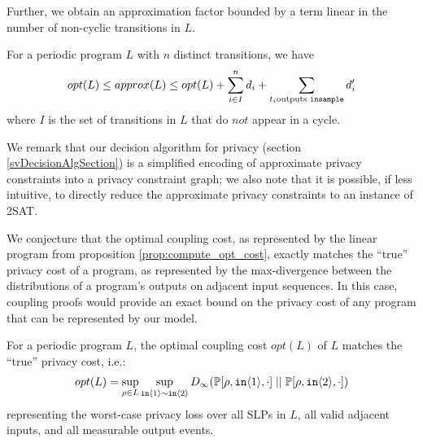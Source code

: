 Further, we obtain an approximation factor bounded by a term linear in the number of non-cyclic transitions in $L$. 

\begin{prop}
    \label{prop:approx_opt_are_close}
    For a periodic program $L$ with $n$ distinct transitions, we have 
    \[opt(L) \leq approx(L) \leq opt(L) + \sum_{i \in I }^n d_i + \sum_{t_i \text{outputs \texttt{insample}}} d_i'\]
    where $I$ is the set of transitions in $L$ that do $\textit{not}$ appear in a cycle.
\end{prop}

We remark that our decision algorithm for privacy (section \ref{svDecisionAlgSection}) is a simplified encoding of approximate privacy constraints into a privacy constraint graph; we also note that it is possible, if less intuitive, to directly reduce the approximate privacy constraints to an instance of 2SAT. 

We conjecture that the optimal coupling cost, as represented by the linear program from proposition \ref{prop:compute_opt_cost}, exactly matches the ``true'' privacy cost of a program, as represented by the max-divergence between the distributions of a program's outputs on adjacent input sequences. In this case, coupling proofs would provide an exact bound on the privacy cost of any program that can be represented by our model. 

\begin{conj}
    For a periodic program $L$, the optimal coupling cost $opt(L)$ of $L$ matches the ``true'' privacy cost, i.e.:
    \begin{align*}
        opt(L) = \sup_{\rho \in L} \sup_{\texttt{in}\langle1 \rangle \sim \texttt{in}\langle2 \rangle} D_\infty(\mathbb{P}[\rho, \texttt{in}\langle1 \rangle, \cdot]\; ||\; \mathbb{P}[\rho, \texttt{in}\langle2 \rangle, \cdot])
    \end{align*}
    representing the worst-case privacy loss over all SLPs in $L$, all valid adjacent inputs, and all measurable output events.
\end{conj}
